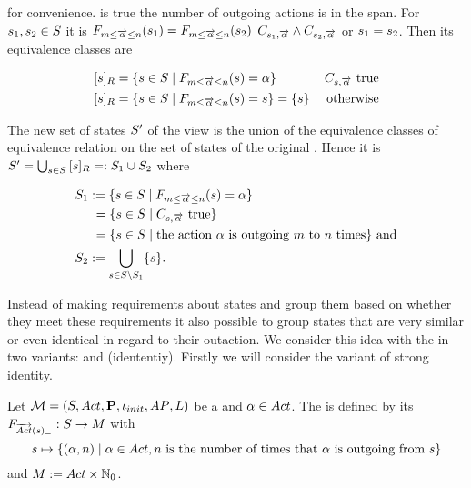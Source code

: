 \documentclass[preview]{standalone}
\begin{document}
for convenience. \formoutact is true  \iffN the number of outgoing actions is in the span. For ${s}_1, {s}_2 \in {S}$ it is ${{{{F}}_{{m}\leq{\overrightarrow{\ensuremath{{\alpha}}}}\leq{n}}}}({s}_1) = {{{{F}}_{{m}\leq{\overrightarrow{\ensuremath{{\alpha}}}}\leq{n}}}}({s}_2)$ \iffN $\formoutact[\state_1] \land \formoutact[\state_2]$ or ${s}_1 = {s}_2$. Then its equivalence classes are

\begin{align*}
	\eqclassv{\state} &= \{\state \in \states \mid \gfctspanoutaction(\state) = \action\} &\formoutact \text{ true} \\
	\eqclassv{\state} &= \{\state \in \states \mid \gfctspanoutaction(\state) = \state\} = \{\state\} &\text{ otherwise}	
\end{align*}

The new set of states ${S}'$ of the view \viewspanoutaction is the union of the equivalence classes of equivalence relation \eqrelview on the set of states \states of the original \chosengraphtypeN. Hence it is ${S}' = \bigcup_{{s} \in {S}} {{[{s}]_{{R}}}} =: {S}_1 \cup {S}_2$ where

\begin{align*}
	\states_1 &:= \{\state \in \states \mid \gfctspanoutaction(\state) = \action\} \\
	&\hspace{1.15mm}= \{\state \in \states  \mid \formoutact \text{ true}\} \\
	&\hspace{1.15mm}= \{\state \in \states \mid \text{the action } \action \text{ is outgoing } \numoutactb \text{ to } \numoutact \text{ times}\} \text{ and} \\
	\states_2 &:= \remstates.
\end{align*}


Instead of making requirements about states and group them based on whether they meet these requirements it also possible to group states that are very similar or even identical in regard to their outaction. We consider this idea with the \emph{\outactident \viewNC} in two variants: \outactidentstrong and \outactidentweak (idententiy). Firstly we will consider the variant of strong identity.

\begin{definition}
	Let ${{{\mathcal{M}}}} = {{({S}, {Act}, {\textbf{P}}, {\iota_{init}}, {AP}, {L})}}$ be a \chosengraphtypeN and ${\alpha} \in {Act}$. The \viewN \viewstrongoutactident is defined by its \grpfctN ${{{{F}}_{{\overrightarrow{{Act}}}({s})_=}}} : {S} \to {\ensuremath{{M}}}$ with
	\[
	\state \mapsto	
	\{(\action, \numoutact) \mid \action \in \actions, \numoutact \text{ is the number of times that \action is outgoing from } \state\}
	\]
	and ${{M}} := {Act} \times {\mathbb{N}}_0$.
\end{definition}
\end{document}
